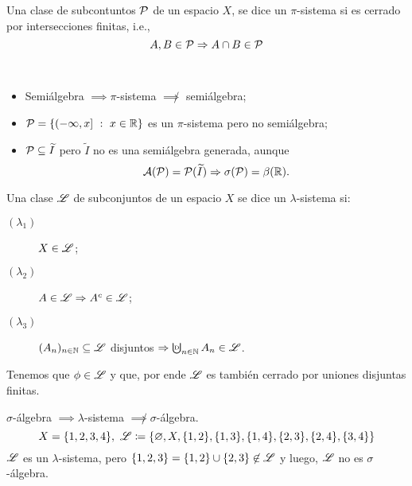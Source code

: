 \begin{definition}[$\pi$-sistema]
	Una clase de subcontuntos $\mathcal{P}$ de un espacio $X$, se dice un $\pi$-sistema si es cerrado por intersecciones finitas, i.e.,
	\[ A,B \in \mathcal{P} \Rightarrow{} A \cap B \in \mathcal{P} \]
\end{definition}

\begin{eg}~
	\begin{itemize}
		\item Semiálgebra $\implies \pi$-sistema $\not\implies$ semiálgebra;
		
		\item $\mathcal{P} = \{(-\infty,x] \ : \ x \in \mathbb{R}\}$ es un $\pi$-sistema pero no semiálgebra;

		\item $\mathcal{P} \subseteq \widetilde{I}$ pero $\widetilde{I}$ no es una semiálgebra generada, aunque
		\[ \mathcal{A}(\mathcal{P}) = \mathcal{P}(\widetilde{I}) \Rightarrow \sigma(\mathcal{P}) = \beta(\mathbb{R}). \]
	\end{itemize}
\end{eg}

\begin{definition}
	Una clase $\mathscr{L}$ de subconjuntos de un espacio $X$ se dice un $\lambda$-sistema si:
	\begin{description}
		\item[$(\lambda_{1})$] $X \in \mathscr{L}$;

		\item[$(\lambda_{2})$] $A \in \mathscr{L} \Rightarrow A^c \in \mathscr{L}$;

		\item[$(\lambda_{3})$] $(A_n)_{n\in\mathbb{N}} \subseteq \mathscr{L}$ disjuntos $\implies \textbigcupd_{n\in\N} A_n \in \mscr{L}$.
	\end{description}
\end{definition}

\begin{note}
	Tenemos que $\phi \in \mathscr{L}$ y que, por ende $\mathscr{L}$ es también cerrado por uniones disjuntas finitas.
\end{note}

\begin{eg}
	$\sigma$-álgebra $\implies \lambda$-sistema $\not\implies \sigma$-álgebra.
	\[ X = \{1,2,3,4\}, \ \mathscr{L} \coloneq \{\varnothing, X, \{1,2\}, \{1,3\}, \{1,4\}, \{2,3\}, \{2,4\}, \{3,4\}\} \]
	$\mathscr{L}$ es un $\lambda$-sistema, pero $\{1,2,3\} = \{1,2\} \cup \{2,3\} \not\in \mathscr{L}$ y luego, $\mathscr{L}$ no es $\sigma$-álgebra.
\end{eg}

